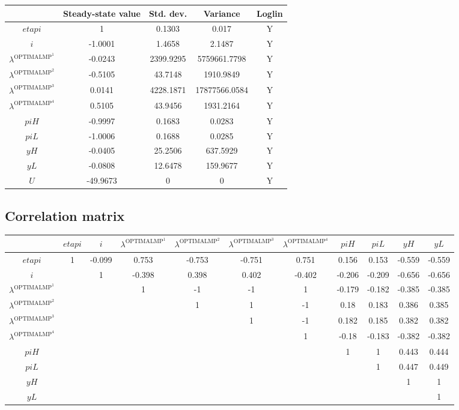 \begin{tabular}{c|c|c|c|c|}
  & Steady-state value & Std. dev. & Variance & Loglin\\
\hline
${e\!t\!a\!p\!i}$ & 1 & 0.1303 & 0.017 & Y    \\
$i$ & -1.0001 & 1.4658 & 2.1487 & Y    \\
$\lambda^{\mathrm{OPTIMALMP}^{\mathrm{1}}}$ & -0.0243 & 2399.9295 & 5759661.7798 & Y    \\
$\lambda^{\mathrm{OPTIMALMP}^{\mathrm{2}}}$ & -0.5105 & 43.7148 & 1910.9849 & Y    \\
$\lambda^{\mathrm{OPTIMALMP}^{\mathrm{3}}}$ & 0.0141 & 4228.1871 & 17877566.0584 & Y    \\
$\lambda^{\mathrm{OPTIMALMP}^{\mathrm{4}}}$ & 0.5105 & 43.9456 & 1931.2164 & Y    \\
${p\!i\!H}$ & -0.9997 & 0.1683 & 0.0283 & Y    \\
${p\!i\!L}$ & -1.0006 & 0.1688 & 0.0285 & Y    \\
${y\!H}$ & -0.0405 & 25.2506 & 637.5929 & Y    \\
${y\!L}$ & -0.0808 & 12.6478 & 159.9677 & Y    \\
$U$ & -49.9673 & 0 & 0 & Y    \\
\hline
\end{tabular}


\subsection{Correlation matrix}

\begin{tabular}{c|cccccccccc|}
  & ${e\!t\!a\!p\!i}$ & $i$ & $\lambda^{\mathrm{OPTIMALMP}^{\mathrm{1}}}$ & $\lambda^{\mathrm{OPTIMALMP}^{\mathrm{2}}}$ & $\lambda^{\mathrm{OPTIMALMP}^{\mathrm{3}}}$ & $\lambda^{\mathrm{OPTIMALMP}^{\mathrm{4}}}$ & ${p\!i\!H}$ & ${p\!i\!L}$ & ${y\!H}$ & ${y\!L}$\\
\hline
${e\!t\!a\!p\!i}$ & 1 & -0.099 & 0.753 & -0.753 & -0.751 & 0.751 & 0.156 & 0.153 & -0.559 & -0.559 \\
$i$ &  & 1 & -0.398 & 0.398 & 0.402 & -0.402 & -0.206 & -0.209 & -0.656 & -0.656 \\
$\lambda^{\mathrm{OPTIMALMP}^{\mathrm{1}}}$ &  &  & 1 & -1 & -1 & 1 & -0.179 & -0.182 & -0.385 & -0.385 \\
$\lambda^{\mathrm{OPTIMALMP}^{\mathrm{2}}}$ &  &  &  & 1 & 1 & -1 & 0.18 & 0.183 & 0.386 & 0.385 \\
$\lambda^{\mathrm{OPTIMALMP}^{\mathrm{3}}}$ &  &  &  &  & 1 & -1 & 0.182 & 0.185 & 0.382 & 0.382 \\
$\lambda^{\mathrm{OPTIMALMP}^{\mathrm{4}}}$ &  &  &  &  &  & 1 & -0.18 & -0.183 & -0.382 & -0.382 \\
${p\!i\!H}$ &  &  &  &  &  &  & 1 & 1 & 0.443 & 0.444 \\
${p\!i\!L}$ &  &  &  &  &  &  &  & 1 & 0.447 & 0.449 \\
${y\!H}$ &  &  &  &  &  &  &  &  & 1 & 1 \\
${y\!L}$ &  &  &  &  &  &  &  &  &  & 1 \\
\hline
\end{tabular}


